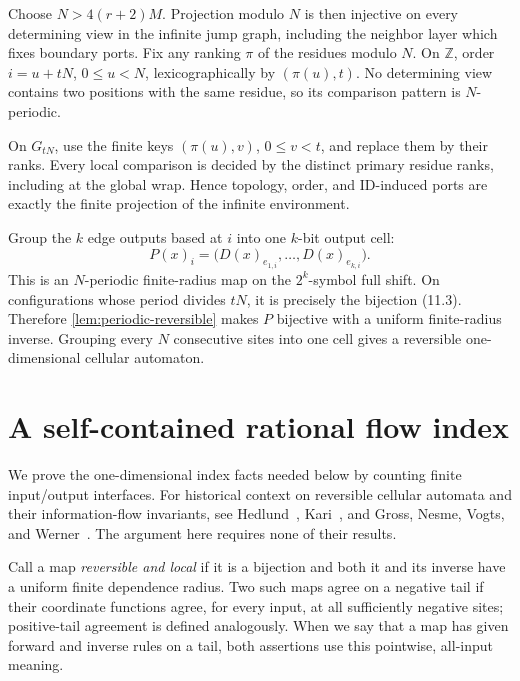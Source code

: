 \documentclass[11pt]{article}
\theoremstyle{definition}
\theoremstyle{remark}
\begin{document}
Choose $N>4(r+2)M$.  Projection modulo $N$ is then injective on every
determining view in the infinite jump graph, including the neighbor layer
which fixes boundary ports.  Fix any ranking $\pi$ of the residues modulo
$N$.  On $\mathbb Z$, order $i=u+tN$, $0\le u<N$, lexicographically by
$(\pi(u),t)$.  No determining view contains two positions with the same
residue, so its comparison pattern is $N$-periodic.

On $G_{tN}$, use the finite keys $(\pi(u),v)$, $0\le v<t$, and replace them
by their ranks.  Every local comparison is decided by the distinct primary
residue ranks, including at the global wrap.  Hence topology, order, and
ID-induced ports are exactly the finite projection of the infinite
environment.

Group the $k$ edge outputs based at $i$ into one $k$-bit output cell:
\[
 P(x)_i=\bigl(D(x)_{e_{1,i}},\ldots,D(x)_{e_{k,i}}\bigr).
                                                                    \tag{11.4}
\]
This is an $N$-periodic finite-radius map on the $2^k$-symbol full shift.
On configurations whose period divides $tN$, it is precisely the bijection
(11.3).  Therefore \cref{lem:periodic-reversible} makes $P$ bijective with
a uniform finite-radius inverse.  Grouping every $N$ consecutive sites
into one cell gives a reversible one-dimensional cellular automaton.

\section{A self-contained rational flow index}
\label{sec:index}

We prove the one-dimensional index facts needed below by counting finite
input/output interfaces.  For historical context on reversible cellular
automata and their information-flow invariants, see
Hedlund~\cite{Hedlund1969ShiftDynamical},
Kari~\cite{Kari1996BlockPermutations}, and
Gross, Nesme, Vogts, and Werner~\cite{GrossNesmeVogtsWerner2012Index}.
The argument here requires none of their results.

Call a map \emph{reversible and local} if it is a bijection and both it
and its inverse have a uniform finite dependence radius.  Two such maps
agree on a negative tail if their coordinate functions agree, for every
input, at all sufficiently negative sites; positive-tail agreement is
defined analogously.  When we say that a map has given forward and inverse
rules on a tail, both assertions use this pointwise, all-input meaning.
\end{document}

